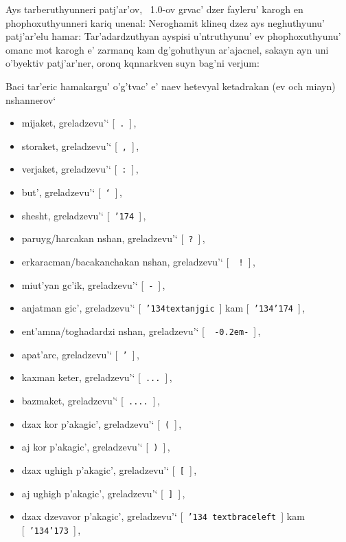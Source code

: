 \documentclass[12pt,a4paper]{article}
\def\mybs{\char'134}
\def\mybar{\char'174}
\def\mylbrace{\char'173}
\begin{document}
Ays tarberuthyunneri patj'ar'ov, \ArmTeX\ 1.0-ov grvac' dzer fayleru' karogh
en phophoxuthyunneri kariq unenal: Neroghamit klineq dzez ays neghuthyunu'
patj'ar'elu hamar: Tar'adardzuthyan ayspisi u'ntruthyunu' ev phophoxuthyunu'
omanc mot karogh e' zarmanq kam dg'gohuthyun a\-r'a\-jac\-nel, sakayn ayn uni
o'byektiv patj'ar'ner, oronq kqnnarkven suyn bag'ni verjum:

Baci tar'eric hamakargu' o'g'tvac' e' naev hetevyal ketadrakan (ev och miayn)
nshannerov`

\begin{itemize}
\item[\artm .]\quad mijaket, greladzevu'` [~{\tt .}~]$\,$,
\item[\artm ,]\quad storaket, greladzevu'` [~{\tt ,}~]$\,$,
\item[\artm :]\quad verjaket, greladzevu'` [~{\tt :}~]$\,$,
\item[\artm `]\quad but', greladzevu'` [~{\tt `}~]$\,$,
\item[\artm |]\quad shesht, greladzevu'` [~{\tt\mybar}~]$\,$,
\item[\artm ?]\quad paruyg/harcakan nshan, greladzevu'` [~{\tt ?}~]$\,$,
\item[\artm !]\quad erkaracman/bacakanchakan nshan, greladzevu'` [~{\tt
    !}~]$\,$,
\item[\artm -]\quad miut'yan gc'ik, greladzevu'` [~{\tt -}~]$\,$,
\item[\artm \|]\quad anjatman gic', greladzevu'` [~{\tt \mybs textanjgic}~]
  kam [~{\tt \mybs\mybar}~]$\,$,
\item[\artm --]\quad ent'amna/toghadardzi nshan, greladzevu'` [~{\tt
    -{\kern0.2em}-}~]$\,$,
\item[\artm ']\quad apat'arc, greladzevu'` [~{\tt '}~]$\,$,
\item[\artm ...]\quad kaxman keter, greladzevu'` [~{\tt ...}~]$\,$,
\item[\artm ....]\quad bazmaket, greladzevu'` [~{\tt ....}~]$\,$,
\item[\artm (]\quad dzax kor p'akagic', greladzevu'` [~{\tt (}~]$\,$,
\item[\artm )]\quad aj kor p'akagic', greladzevu'` [~{\tt )}~]$\,$,
\item[{\artm [}]\quad dzax ughigh p'akagic', greladzevu'` [~{\tt [}~]$\,$,
\item[{\artm ]}]\quad aj ughigh p'akagic', greladzevu'` [~{\tt ]}~]$\,$,
\item[\artm \{]\quad dzax dzevavor p'akagic', greladzevu'` [~{\tt \mybs
    textbraceleft}~] kam [~{\tt \mybs\mylbrace}~]$\,$,

\end{itemize}
\end{document}
